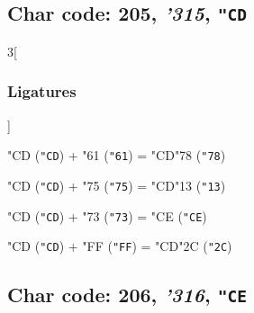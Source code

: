 \documentclass{article}
\newlength{\maxcharwidth}
\begin{document}
\subsection{Char code: 205, {\it'315}, {\tt"CD}}
\label{char_205}


\begin{multicols}{3}[\subsubsection{Ligatures}]

{\testfont\char"CD\noboundary} ({\tt"CD}) + {\testfont\char"61\noboundary} ({\tt"61}) = {\testfont\char"CD\noboundary}{\testfont\char"78\noboundary} ({\tt"78}) 

{\testfont\char"CD\noboundary} ({\tt"CD}) + {\testfont\char"75\noboundary} ({\tt"75}) = {\testfont\char"CD\noboundary}{\testfont\char"13\noboundary} ({\tt"13}) 

{\testfont\char"CD\noboundary} ({\tt"CD}) + {\testfont\char"73\noboundary} ({\tt"73}) = {\testfont\char"CE\noboundary} ({\tt"CE}) 

{\testfont\char"CD\noboundary} ({\tt"CD}) + {\testfont\char"FF\noboundary} ({\tt"FF}) = {\testfont\char"CD\noboundary}{\testfont\char"2C\noboundary} ({\tt"2C}) 

\end{multicols}

\subsection{Char code: 206, {\it'316}, {\tt"CE}}
\label{char_206}

\end{document}
